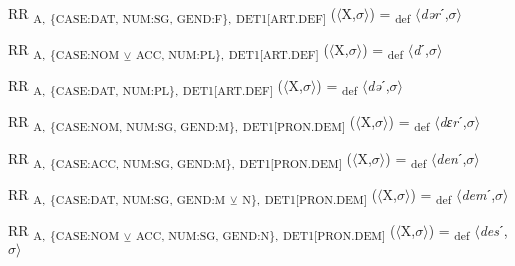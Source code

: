 {\begin{exe}
 RR \textsubscript{A,} \textsubscript{\{CASE:DAT, NUM:SG, GEND:F\},} \textsubscript{DET1[ART.DEF]} ($\langle$X,$\sigma $$\rangle$) = \textsubscript{def} $\langle$\textit{dər}ˊ,$\sigma $$\rangle$
\end{exe}

\begin{exe}
 RR \textsubscript{A,} \textsubscript{\{CASE:NOM} \textsubscript{${\veebar}$}\textsubscript{ ACC, NUM:PL\},} \textsubscript{DET1[ART.DEF]} ($\langle$X,$\sigma $$\rangle$) = \textsubscript{def} $\langle$\textit{d}ˊ,$\sigma $$\rangle$
\end{exe}

\begin{exe}
 RR \textsubscript{A,} \textsubscript{\{CASE:DAT, NUM:PL\},} \textsubscript{DET1[ART.DEF]} ($\langle$X,$\sigma $$\rangle$) = \textsubscript{def} $\langle$\textit{də}ˊ,$\sigma $$\rangle$
\end{exe}

\begin{exe}
 RR \textsubscript{A,} \textsubscript{\{CASE:NOM, NUM:SG, GEND:M\},} \textsubscript{DET1[PRON.DEM]} ($\langle$X,$\sigma $$\rangle$) = \textsubscript{def} $\langle$\textit{dɛr}ˊ,$\sigma $$\rangle$
\end{exe}

\begin{exe}
 RR \textsubscript{A,} \textsubscript{\{CASE:ACC, NUM:SG, GEND:M\},} \textsubscript{DET1[PRON.DEM]} ($\langle$X,$\sigma $$\rangle$) = \textsubscript{def} $\langle$\textit{den}ˊ,$\sigma $$\rangle$
\end{exe}

\begin{exe}
 RR \textsubscript{A,} \textsubscript{\{CASE:DAT, NUM:SG, GEND:M} \textsubscript{${\veebar}$}\textsubscript{ N\},} \textsubscript{DET1[PRON.DEM]} ($\langle$X,$\sigma $$\rangle$) = \textsubscript{def} $\langle$\textit{dem}ˊ,$\sigma $$\rangle$
\end{exe}

\begin{exe}
 RR \textsubscript{A,} \textsubscript{\{CASE:NOM} \textsubscript{${\veebar}$}\textsubscript{ ACC, NUM:SG, GEND:N\},} \textsubscript{DET1[PRON.DEM]} ($\langle$X,$\sigma $$\rangle$) = \textsubscript{def} $\langle$\textit{des}ˊ,$\sigma $$\rangle$
\end{exe}

}
